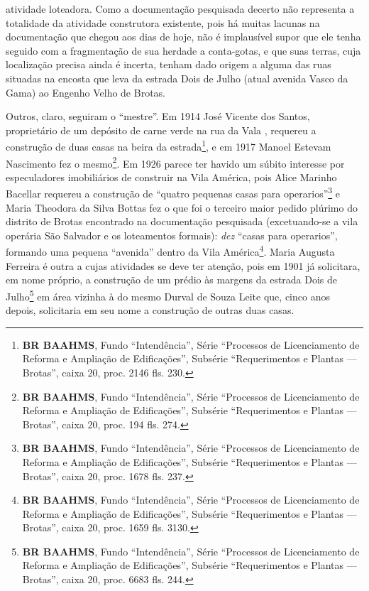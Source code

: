 atividade loteadora. Como a documentação pesquisada decerto não representa a totalidade da atividade construtora existente, pois há muitas lacunas na documentação que chegou aos dias de hoje, não é implausível supor que ele tenha seguido com a fragmentação de sua herdade a conta-gotas, e que suas terras, cuja localização precisa ainda é incerta, tenham dado origem a alguma das ruas situadas na encosta que leva da estrada Dois de Julho (atual avenida Vasco da Gama) ao Engenho Velho de Brotas.

Outros, claro, seguiram o ``mestre''. Em 1914 José Vicente dos Santos, proprietário de um depósito de carne verde na rua da Vala \cite[p.~402]{reis_almanak_1898}, requereu a construção de duas casas na beira da estrada\footnote{\textbf{BR BAAHMS}, Fundo ``Intendência'', Série ``Processos de Licenciamento de Reforma e Ampliação de Edificações'', Subsérie ``Requerimentos e Plantas --- Brotas'', caixa 20, proc. 2146 fls. 230.}, e em 1917 Manoel Estevam Nascimento fez o mesmo\footnote{\textbf{BR BAAHMS}, Fundo ``Intendência'', Série ``Processos de Licenciamento de Reforma e Ampliação de Edificações'', Subsérie ``Requerimentos e Plantas --- Brotas'', caixa 20, proc. 194 fls. 274.}. Em 1926 parece ter havido um súbito interesse por especuladores imobiliários de construir na Vila América, pois Alice Marinho Bacellar requereu a construção de ``quatro pequenas casas para operarios''\footnote{\textbf{BR BAAHMS}, Fundo ``Intendência'', Série ``Processos de Licenciamento de Reforma e Ampliação de Edificações'', Subsérie ``Requerimentos e Plantas --- Brotas'', caixa 20, proc. 1678 fls. 237.} e Maria Theodora da Silva Bottas fez o que foi o terceiro maior pedido plúrimo do distrito de Brotas encontrado na documentação pesquisada (excetuando-se a vila operária São Salvador e os loteamentos formais): \textit{dez} ``casas para operarios'', formando uma pequena ``avenida'' dentro da Vila América\footnote{\textbf{BR BAAHMS}, Fundo ``Intendência'', Série ``Processos de Licenciamento de Reforma e Ampliação de Edificações'', Subsérie ``Requerimentos e Plantas --- Brotas'', caixa 20, proc. 1659 fls. 3130.}. Maria Augusta Ferreira é outra a cujas atividades se deve ter atenção, pois em 1901 já solicitara, em nome próprio, a construção de um prédio às margens da estrada Dois de Julho\footnote{\textbf{BR BAAHMS}, Fundo ``Intendência'', Série ``Processos de Licenciamento de Reforma e Ampliação de Edificações'', Subsérie ``Requerimentos e Plantas --- Brotas'', caixa 20, proc. 6683 fls. 244.} em área vizinha à do mesmo Durval de Souza Leite que, cinco anos depois, solicitaria em seu nome a construção de outras duas casas.


